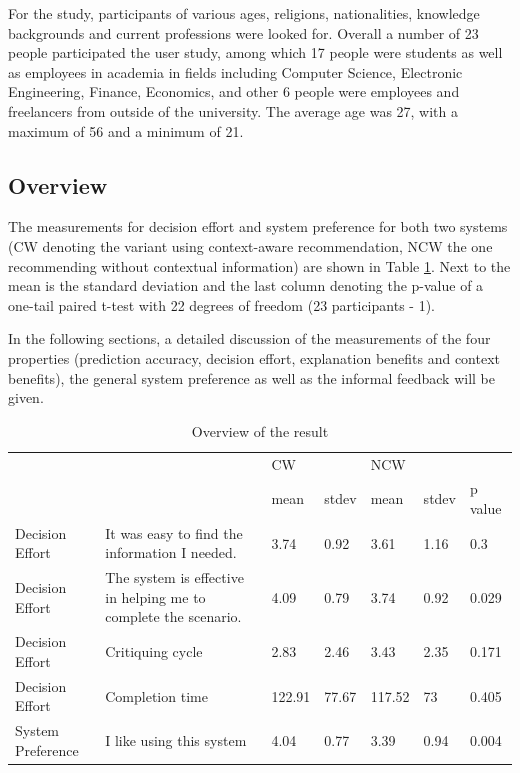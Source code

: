 For the study, participants of various ages, religions, nationalities, knowledge backgrounds and current professions were looked for. Overall a number of 23 people participated the user study, among which 17 people were students as well as employees in academia in fields including Computer Science, Electronic Engineering, Finance, Economics, and other 6 people were employees and freelancers from outside of the university. The average age was 27, with a maximum of 56 and a minimum of 21.

\subsection{Overview} \label{sec:results_o}

The measurements for decision effort and system preference for both two systems (CW denoting the variant using context-aware recommendation, NCW the one recommending without contextual information) are shown in Table \ref{tab:overview}. Next to the mean is the standard deviation and the last column denoting the p-value of a one-tail paired t-test with 22 degrees of freedom (23 participants - 1).

In the following sections, a detailed discussion of the measurements of the four properties (prediction accuracy, decision effort, explanation benefits and context benefits), the general system preference as well as the informal feedback will be given.

\begin{table}[H]
	\centering
	\caption{Overview of the result}
	\label{tab:overview}
	\small
	\begin{tabular}{p{0.6in}p{1.2in}p{0.5in}p{0.5in}p{0.5in}p{0.5in}p{0.5in}}
	           \hline
		 &  & CW &  & NCW \\ 
 		 &  & mean & stdev & mean & stdev & p value \\ \hline
		 Decision Effort & It was easy to find the information I needed. & 3.74 & 0.92 & 3.61 & 1.16 & 0.3 \\ 
		Decision Effort & The system is effective in helping me to complete the scenario. & 4.09 & 0.79 & 3.74 & 0.92 & 0.029 \\ 
		Decision Effort & Critiquing cycle & 2.83 & 2.46 & 3.43 & 2.35 & 0.171 \\ 
		Decision Effort & Completion time & 122.91 & 77.67 & 117.52 & 73 & 0.405 \\  \hline
		System Preference & I like using this system & 4.04 & 0.77 & 3.39 & 0.94 & 0.004 \\ \hline
	\end{tabular}
\end{table}

